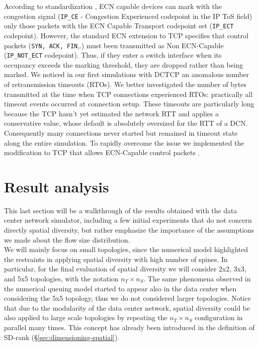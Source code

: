 According to standardization \cite{ipecn}, ECN capable devices can mark with the congestion signal (\texttt{IP\_CE} - Congestion Experienced codepoint in the IP ToS field) only those packets with the  ECN Capable Transport codepoint set (\texttt{IP\_ECT} codepoint). However, the standard ECN extension to TCP specifies that control packets (\texttt{SYN, ACK, FIN},.) must been transmitted as Non ECN-Capable (\texttt{IP\_NOT\_ECT} codepoint). Thus, if they enter a switch interface when its occupancy exceeds the marking threshold, they are dropped rather than being marked. We noticed in our first simulations with DCTCP an anomalous number of retransmission timeouts (RTOs). We better investigated the number of bytes transmitted at the time when TCP connections experienced RTOs: practically all timeout events occurred at connection setup. These timeouts are particularly long because the TCP hasn't yet estimated the network RTT and applies a conservative value, whose default is absolutely oversized for the RTT of a DCN. Consequently many connections never started but remained in timeout state along the entire simulation. To rapidly overcome the issue we implemented the modification to TCP that allows ECN-Capable control packets \cite{synecn}.
\section{Result analysis}
This last section will be a walkthrough of the results obtained with the data center network simulator, including a few initial experiments that do not concern directly spatial diversity, but rather emphasize the importance of the assumptions we made about the flow size distribution. \\
We will mainly focus on small topologies, since the numerical model highlighted the restraints in applying spatial diversity with high number of spines. In particular, for the final evaluation of spatial diversity we will consider 2x2, 3x3, and 5x5 topologies, with the notation $n_T \times n_S$. The same phenomena observed in the numerical queuing model started to appear also in the data center when considering the 5x5 topology, thus we do not considered larger topologies. Notice that due to the modularity of the data center network, spatial diversity could be also applied to large scale topologies by repeating the $n_T \times n_S$ configuration in parallel many times. This concept has already been introduced in the definition of SD-rank (\S \ref{sec:dimensioning-spatial}). 
